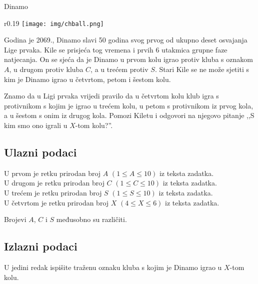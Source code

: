 \begin{statement}[
  problempoints=20,
  timelimit=1 sekunda,
  memorylimit=512 MiB,
]{Dinamo}


\setlength\intextsep{-0.1cm}
\begin{wrapfigure}[7]{r}{0.19\textwidth}
\centering
\texttt{[image: img/chball.png]}
\end{wrapfigure}

Godina je 2069., Dinamo slavi 50 godina svog prvog od ukupno deset osvajanja
Lige prvaka. Kile se prisjeća tog vremena i prvih 6 utakmica grupne faze
natjecanja. On se sjeća da je Dinamo u prvom kolu igrao protiv kluba s oznakom
$A$, u drugom protiv kluba $C$, a u trećem protiv $S$. Stari Kile se ne može
sjetiti s kim je Dinamo igrao u četvrtom, petom i šestom kolu.

Znamo da u Ligi prvaka vrijedi pravilo da u četvrtom kolu klub igra s
protivnikom s kojim je igrao u trećem kolu, u petom s protivnikom iz prvog kola,
a u šestom s onim iz drugog kola. Pomozi Kiletu i odgovori na njegovo pitanje
,,S kim smo ono igrali u $X$-tom kolu?''.

\subsection*{Ulazni podaci}
U prvom je retku prirodan broj $A$ $(1 \le A \le 10)$ iz teksta zadatka. \\
U drugom je retku prirodan broj $C$ $(1 \le C \le 10)$ iz teksta zadatka. \\
U trećem je retku prirodan broj $S$ $(1 \le S \le 10)$ iz teksta zadatka. \\
U četvrtom je retku prirodan broj $X$ $(4 \le X \le 6)$ iz teksta zadatka.

Brojevi $A$, $C$ i $S$ međusobno su različiti.

\subsection*{Izlazni podaci}
U jedini redak ispišite traženu oznaku kluba s kojim je Dinamo igrao u $X$-tom
kolu.



\end{statement}
